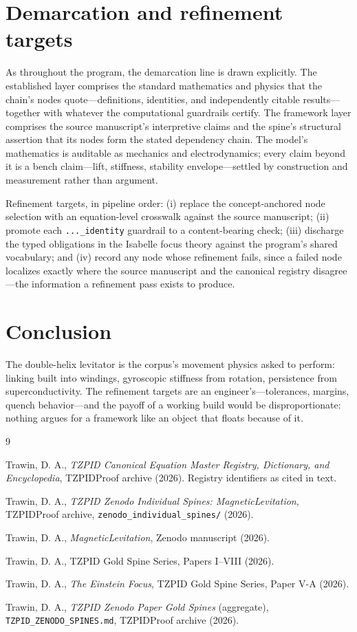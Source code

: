 \documentclass[11pt]{article}
\theoremstyle{remark}
\begin{document}
\section{Demarcation and refinement targets}
\label{sec:demarc}

As throughout the program, the demarcation line is drawn explicitly. The established layer comprises the standard mathematics and physics that the chain's nodes quote---definitions, identities, and independently citable results---together with whatever the computational guardrails certify. The framework layer comprises the source manuscript's interpretive claims and the spine's structural assertion that its nodes form the stated dependency chain. The model's mathematics is auditable as mechanics and electrodynamics; every claim beyond it is a bench claim---lift, stiffness, stability envelope---settled by construction and measurement rather than argument.

Refinement targets, in pipeline order: (i) replace the concept-anchored node selection with an equation-level crosswalk against the source manuscript; (ii) promote each \texttt{...\_identity} guardrail to a content-bearing check; (iii) discharge the typed obligations in the Isabelle focus theory against the program's shared vocabulary; and (iv) record any node whose refinement fails, since a failed node localizes exactly where the source manuscript and the canonical registry disagree---the information a refinement pass exists to produce.

\section{Conclusion}
\label{sec:conc}

The double-helix levitator is the corpus's movement physics asked to perform: linking built into windings, gyroscopic stiffness from rotation, persistence from superconductivity. The refinement targets are an engineer's---tolerances, margins, quench behavior---and the payoff of a working build would be disproportionate: nothing argues for a framework like an object that floats because of it.

\begin{thebibliography}{9}

 Trawin, D. A., \emph{TZPID Canonical Equation Master Registry, Dictionary, and Encyclopedia}, TZPIDProof archive (2026). Registry identifiers as cited in text.

 Trawin, D. A., \emph{TZPID Zenodo Individual Spines: MagneticLevitation}, TZPIDProof archive, \texttt{zenodo\_individual\_spines/} (2026).

 Trawin, D. A., \emph{MagneticLevitation}, Zenodo manuscript (2026).

 Trawin, D. A., TZPID Gold Spine Series, Papers I--VIII (2026).

 Trawin, D. A., \emph{The Einstein Focus}, TZPID Gold Spine Series, Paper V-A (2026).

 Trawin, D. A., \emph{TZPID Zenodo Paper Gold Spines} (aggregate), \texttt{TZPID\_ZENODO\_SPINES.md}, TZPIDProof archive (2026).

\end{thebibliography}
\end{document}
